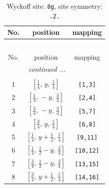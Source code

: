 \documentclass[fleqn,8pt]{jsarticle}
\begin{document}
\begin{longtable}{ccc}
\caption{Wyckoff site: {\tt 8g}, site symmetry: {\tt .2.}}
 \\
 \hline \hline
No. & position & mapping \\ \hline \endfirsthead

\multicolumn{2}{l}{\tablename\ \thetable{}} \\
 \hline \hline
No. & position & mapping \\ \hline \endhead

 \hline \hline
\multicolumn{2}{r}{\footnotesize\it continued ...} \\ \endfoot

 \hline \hline
\multicolumn{2}{r}{} \\ \endlastfoot

1 & $\left[ \frac{1}{4},\, y,\, \frac{1}{4} \right]$ & {\tt [1,3]} \\ \hline
2 & $\left[ \frac{1}{4},\, - y,\, \frac{3}{4} \right]$ & {\tt [2,4]} \\ \hline
3 & $\left[ \frac{3}{4},\, - y,\, \frac{3}{4} \right]$ & {\tt [5,7]} \\ \hline
4 & $\left[ \frac{3}{4},\, y,\, \frac{1}{4} \right]$ & {\tt [6,8]} \\ \hline
5 & $\left[ \frac{1}{4},\, y + \frac{1}{2},\, \frac{1}{4} \right]$ & {\tt [9,11]} \\ \hline
6 & $\left[ \frac{1}{4},\, \frac{1}{2} - y,\, \frac{3}{4} \right]$ & {\tt [10,12]} \\ \hline
7 & $\left[ \frac{3}{4},\, \frac{1}{2} - y,\, \frac{3}{4} \right]$ & {\tt [13,15]} \\ \hline
8 & $\left[ \frac{3}{4},\, y + \frac{1}{2},\, \frac{1}{4} \right]$ & {\tt [14,16]} \\
\end{longtable}
\renewcommand{\arraystretch}{1.2}
\end{document}
